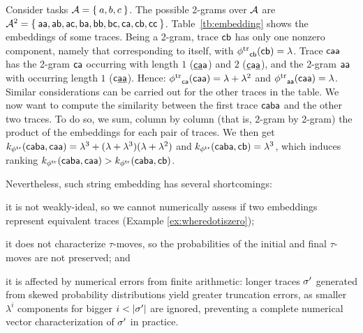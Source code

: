 \begin{example}\label{ex:wheredotiszero} %
	Consider tasks $\mathcal{A}=\Set{a,b,c}$. The possible 2-grams over $\mathcal{A}$ are $\mathcal{A}^2=\Set{\mathsf{aa},\mathsf{ab},\mathsf{ac},\mathsf{ba},\mathsf{bb},\mathsf{bc},\mathsf{ca},\mathsf{cb},\mathsf{cc}}$. Table~\ref{tb:embedding} shows the embeddings of some traces. Being a 2-gram, trace $\mathsf{cb}$ has only one nonzero component, namely that corresponding to itself, with ${\phi^{\text{tr}}}_{\mathsf{cb}}(\mathsf{cb})=\lambda$. Trace $\mathsf{caa}$ has the 2-gram $\mathsf{ca}$ occurring with length $1$ ($\mathsf{\underline{ca}a}$) and $2$ ($\mathsf{\underline{c}a\underline{a}}$), and the 2-gram $\mathsf{aa}$ with occurring length $1$ ($\mathsf{c\underline{aa}}$). Hence: ${\phi^{\text{tr}}}_{\mathsf{ca}}(\mathsf{caa})=\lambda+\lambda^2$ and  ${\phi^{\text{tr}}}_{\mathsf{aa}}(\mathsf{caa})=\lambda$.  Similar considerations can be carried out for the other traces in the table.
	We now want to compute the similarity between the first trace $\mathsf{caba}$ and the other two traces. To do so, we sum, column by column (that is, 2-gram by 2-gram) the product of the embeddings for each pair of traces. We then get $k_{{\phi^{\text{tr}}}}(\mathsf{caba},\mathsf{caa})=\lambda^3+(\lambda+\lambda^3)(\lambda+\lambda^2)$ and $k_{{\phi^{\text{tr}}}}(\mathsf{caba},\mathsf{cb})=\lambda^3
	$,
	which induces ranking $
	k_{{\phi^{\text{tr}}}}(\mathsf{caba},\mathsf{caa})>
	k_{{\phi^{\text{tr}}}}(\mathsf{caba},\mathsf{cb})
	$.
\end{example}

Nevertheless, such string embedding has several shortcomings: \begin{alphalist}
	\item it is not weakly-ideal, so we cannot numerically assess if two embeddings represent equivalent traces 
	(Example \ref{ex:wheredotiszero});
	\item it does not characterize $\tau$-moves, so the probabilities of the initial and final $\tau$-moves are not preserved; and
	\item it is affected by numerical errors from finite arithmetic: longer traces ${\sigma'}$ generated from skewed probability 
	distributions %
	yield greater truncation errors, as smaller $\lambda^i$ components for bigger 
	$i<|\nonlogtrace|$ are ignored, preventing a complete numerical vector characterization of  ${\sigma'}$ in practice.
\end{alphalist}

\endinput




